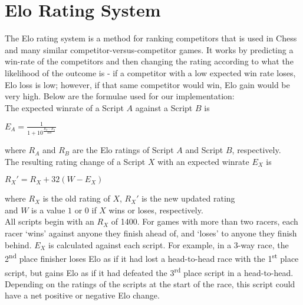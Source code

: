 \section{Elo Rating System}
\label{Elo}
The Elo rating system is a method for ranking competitors that is used in Chess and many similar competitor-versus-competitor games. It works by predicting a win-rate of the competitors and then changing the rating according to what the likelihood of the outcome is - if a competitor with a low expected win rate loses, Elo loss is low; however, if that same competitor would win, Elo gain would be very high. Below are the formulae used for our implementation:\\

\noindent The expected winrate of a Script $A$ against a Script $B$ is \\

{\Large\centerline{$E_{A} = \frac{1}{1 + 10^\frac{R_{B}-R_{A}}{400}}$}} \vspace{2mm}

\hspace*{5mm} where $R_{A}$ and $R_{B}$ are the Elo ratings of Script $A$ and Script $B$, respectively.\\

\noindent The resulting rating change of a Script $X$ with an expected winrate $E_{X}$ is \\

{\Large\centerline{$R_{X}' = R_{X} + 32(W - E_{X})$}} \vspace{2mm}

\hspace*{5mm} where $R_{X}$ is the old rating of $X$, $R_{X}'$ is the new updated rating \\
\hspace*{17mm} and $W$ is a value $1$ or $0$ if $X$ wins or loses, respectively.\\

All scripts begin with an $R_{X}$ of 1400.  For games with more than two racers, each racer `wins' against anyone they finish ahead of, and `loses' to anyone they finish behind. $E_{X}$ is calculated against each script. For example, in a 3-way race, the 2\textsuperscript{nd} place finisher loses Elo as if it had lost a head-to-head race with the 1\textsuperscript{st} place script, but gains Elo as if it had defeated the 3\textsuperscript{rd} place script in a head-to-head. Depending on the ratings of the scripts at the start of the race, this script could have a net positive or negative Elo change.


